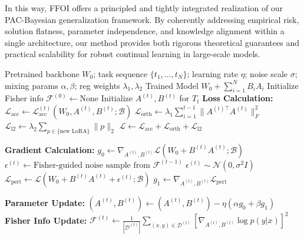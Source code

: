 \documentclass[letterpaper]{article} %
\begin{document}
In this way, FFOI offers a principled and tightly integrated realization of our PAC-Bayesian generalization framework. By coherently addressing empirical risk, solution flatness, parameter independence, and knowledge alignment within a single architecture, our method provides both rigorous theoretical guarantees and practical scalability for robust continual learning in large-scale models.




\begin{algorithm}[thpb]
\caption{Multi-LoRA Training with Task-Aware Perturbation and Orthogonalization}
\label{alg:multi_lora_orth_rwp}
\begin{algorithmic}[1]
\REQUIRE Pretrained backbone $W_0$; task sequence $\{t_1, \dots, t_N\}$; learning rate $\eta$; noise scale $\sigma$; mixing params $\alpha,\beta$; reg weights $\lambda_1,\lambda_2$
\ENSURE Trained Model $W_0+\sum_{i=1}^NB_iA_i$
\STATE Initialize Fisher info $\mathcal{F}^{(0)} \gets \text{None}$
    \STATE Initialize $A^{(t)}, B^{(t)}$ for $T_t$
        \STATE \textbf{Loss Calculation:}
        \STATE $\mathcal{L}_{\text{acc}} \gets \mathcal{L}_{\text{acc}}^{(t)}(W_0, A^{(t)}, B^{(t)}; \mathcal{B})$
        \STATE $\mathcal{L}_{\text{orth}} \gets \lambda_1 \sum_{i=1}^{t-1} \|A^{(i)\top} A^{(t)}\|_F^2$
        \STATE $\mathcal{L}_{\text{l2}} \gets \lambda_2 \sum_{p \in \{\text{new LoRA}\}} \|p\|_2$
        \STATE $\mathcal{L} \gets \mathcal{L}_{\text{acc}} + \mathcal{L}_{\text{orth}} + \mathcal{L}_{\text{l2}}$
        
        \STATE \textbf{Gradient Calculation:}
        \STATE $g_0 \gets \nabla_{A^{(t)}, B^{(t)}} \mathcal{L}(W_0 + B^{(t)}A^{(t)}; \mathcal{B})$
            \STATE $\epsilon^{(t)} \gets \text{Fisher-guided noise sample from } \mathcal{F}^{(t-1)}$
        \ELSE
            \STATE $\epsilon^{(t)} \sim \mathcal{N}(0, \sigma^2 I)$
        \ENDIF
        \STATE $\mathcal{L}_{\text{pert}} \gets \mathcal{L}(W_0 + B^{(t)}A^{(t)} + \epsilon^{(t)}; \mathcal{B})$
        \STATE $g_1 \gets \nabla_{A^{(t)}, B^{(t)}} \mathcal{L}_{\text{pert}}$
        
        \STATE \textbf{Parameter Update:}
        \STATE $(A^{(t)}, B^{(t)}) \gets (A^{(t)}, B^{(t)}) - \eta (\alpha g_0 + \beta g_1)$
    \ENDFOR
    \STATE \textbf{Fisher Info Update:}
    \STATE $\mathcal{F}^{(t)} \gets \frac{1}{|\mathcal{D}^{(t)}|} \sum_{(x,y) \in \mathcal{D}^{(t)}} \left[\nabla_{A^{(t)}, B^{(t)}} \log p(y|x)\right]^2$
\ENDFOR
\end{algorithmic}
\end{algorithm}
\end{document}

